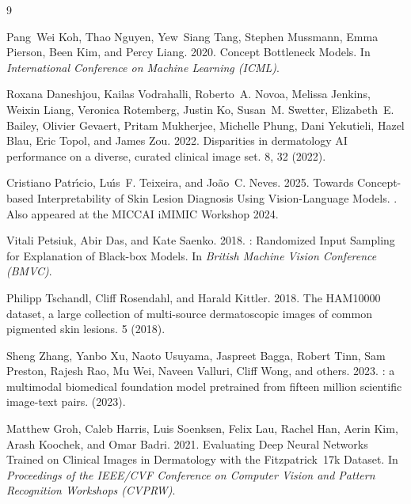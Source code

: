 \documentclass[sigconf,nonacm,screen]{acmart}
\begin{document}
\begin{thebibliography}{9}

Pang~Wei Koh, Thao Nguyen, Yew~Siang Tang, Stephen Mussmann, Emma Pierson,
  Been Kim, and Percy Liang. 2020.
\newblock Concept Bottleneck Models.
\newblock In {\em International Conference on Machine Learning (ICML)}.

Roxana Daneshjou, Kailas Vodrahalli, Roberto~A. Novoa, Melissa Jenkins,
  Weixin Liang, Veronica Rotemberg, Justin Ko, Susan~M. Swetter,
  Elizabeth~E. Bailey, Olivier Gevaert, Pritam Mukherjee, Michelle Phung,
  Dani Yekutieli, Hazel Blau, Eric Topol, and James Zou. 2022.
\newblock Disparities in dermatology {AI} performance on a diverse,
  curated clinical image set.
 8, 32 (2022).

Cristiano Patr{\'\i}cio, Lu{\'\i}s~F. Teixeira, and Jo{\~a}o~C. Neves. 2025.
\newblock Towards Concept-based Interpretability of Skin Lesion Diagnosis
  Using Vision-Language Models.
.
  Also appeared at the MICCAI iMIMIC Workshop 2024.

Vitali Petsiuk, Abir Das, and Kate Saenko. 2018.
: Randomized Input Sampling for Explanation of Black-box
  Models.
\newblock In {\em British Machine Vision Conference (BMVC)}.

Philipp Tschandl, Cliff Rosendahl, and Harald Kittler. 2018.
\newblock The {HAM10000} dataset, a large collection of multi-source
  dermatoscopic images of common pigmented skin lesions.
 5 (2018).

Sheng Zhang, Yanbo Xu, Naoto Usuyama, Jaspreet Bagga, Robert Tinn,
  Sam Preston, Rajesh Rao, Mu Wei, Naveen Valluri, Cliff Wong, and others.
  2023.
: a multimodal biomedical foundation model
  pretrained from fifteen million scientific image-text pairs.
 (2023).

Matthew Groh, Caleb Harris, Luis Soenksen, Felix Lau, Rachel Han,
  Aerin Kim, Arash Koochek, and Omar Badri. 2021.
\newblock Evaluating Deep Neural Networks Trained on Clinical Images in
  Dermatology with the {Fitzpatrick~17k} Dataset.
\newblock In {\em Proceedings of the IEEE/CVF Conference on Computer
  Vision and Pattern Recognition Workshops (CVPRW)}.

\end{thebibliography}
\end{document}
